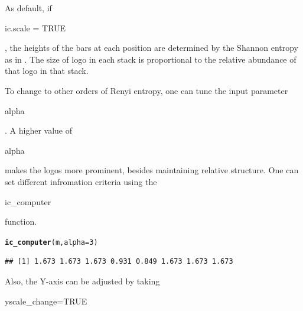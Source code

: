 \documentclass[12pt]{article}\usepackage[]{graphicx}\usepackage[usenames,dvipsnames]{color}
\makeatletter
\newcommand{\hlnum}[1]{\textcolor[rgb]{0.686,0.059,0.569}{#1}}%
\newcommand{\hlstd}[1]{\textcolor[rgb]{0.345,0.345,0.345}{#1}}%
\newcommand{\hlkwc}[1]{\textcolor[rgb]{0.333,0.667,0.333}{#1}}%
\newcommand{\hlkwd}[1]{\textcolor[rgb]{0.737,0.353,0.396}{\textbf{#1}}}%
\newenvironment{kframe}{%
 \def\at@end@of@kframe{}%
 \ifinner\ifhmode%
  \def\at@end@of@kframe{\end{minipage}}%
  \begin{minipage}{\columnwidth}%
 \fi\fi%
 \def\FrameCommand##1{\hskip\@totalleftmargin \hskip-\fboxsep
 \colorbox{shadecolor}{##1}\hskip-\fboxsep
     \hskip-\linewidth \hskip-\@totalleftmargin \hskip\columnwidth}%
 \MakeFramed {\advance\hsize-\width
   \@totalleftmargin\z@ \linewidth\hsize
   \@setminipage}}%
 {\par\unskip\endMakeFramed%
 \at@end@of@kframe}
\newenvironment{knitrout}{}{} %
\makeatother
\begin{document}
\newpage

As default, if \begin{verb} ic.scale = TRUE \end{verb}, the heights of the bars at each position are determined by the Shannon entropy as in . The size of logo in each stack is proportional to the relative abundance of that logo in that stack.

To change to other orders of Renyi entropy, one can tune the input parameter \begin{verb} alpha \end{verb}. A higher value of  \begin{verb} alpha \end{verb} makes the logos more prominent, besides maintaining relative structure. One can set different infromation criteria using the \begin{verb} ic_computer \end{verb}
function.

\begin{knitrout}
\color{fgcolor}\begin{kframe}
\begin{alltt}
\hlkwd{ic_computer}\hlstd{(m,} \hlkwc{alpha}\hlstd{=}\hlnum{3}\hlstd{)}
\end{alltt}
\begin{verbatim}
## [1] 1.673 1.673 1.673 0.931 0.849 1.673 1.673 1.673
\end{verbatim}
\end{kframe}
\end{knitrout}

Also, the Y-axis can be adjusted by taking \begin{verb} yscale_change=TRUE \end{verb}
\end{document}
